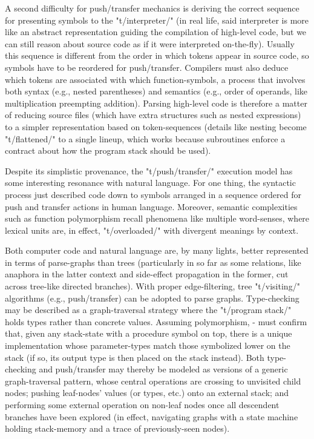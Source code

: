 A second difficulty for push/transfer mechanics is deriving the correct 
sequence for presenting symbols to the "t/interpreter/" (in real life, said 
interpreter is more like an abstract representation guiding the compilation 
of high-level code, but we can still reason about source 
code as if it were interpreted on-the-fly).  Usually this sequence is 
different from the order in which tokens appear in source code, so symbols 
have to be reordered for push/transfer.  Compilers must also deduce which tokens 
are associated with which function-symbols, a process that involves 
both syntax (e.g., nested parentheses) and semantics (e.g., order of operands, 
like multiplication preempting addition).  Parsing high-level code is therefore a 
matter of reducing source files (which have extra structures such as nested 
expressions) to a simpler representation based on token-sequences 
(details like nesting become "t/flattened/" to a single lineup, which works 
because subroutines enforce a contract about how the program stack should be used). 

Despite its simplistic provenance, the "t/push/transfer/" execution model 
has some interesting resonance with natural language.  For one 
thing, the syntactic process just described %
code down to symbols arranged in a sequence ordered for push and transfer 
actions %
in human language.  Moreover, semantic complexities such as 
function polymorphism recall phenomena like multiple word-senses, 
where lexical units are, in effect, "t/overloaded/" with divergent 
meanings by context.  

Both computer code and natural language are, by many lights, 
better represented in terms of parse-graphs than trees 
(particularly in so far as some relations, like anaphora in the latter context 
and side-effect propagation in the former, cut across tree-like 
directed branches).  With proper edge-filtering, tree "t/visiting/" 
algorithms (e.g., push/transfer) can be adopted to parse graphs.
Type-checking may be described as a graph-traversal 
strategy where the "t/program stack/" holds types rather 
than concrete values.  Assuming 
polymorphism, -%
must confirm that, given any stack-state with a 
procedure symbol on top, there is a unique implementation 
whose parameter-types match those symbolized lower on the stack 
(if so, its output type is then placed on the stack 
instead).  Both type-checking 
and push/transfer may thereby be modeled 
as versions of a generic graph-traversal pattern, whose 
central operations are crossing to unvisited child nodes; 
pushing leaf-nodes' values (or types, etc.) onto an 
external stack; and performing some external operation 
on non-leaf nodes once all descendent branches have been explored 
(in effect, navigating graphs with a state 
machine holding stack-memory and a trace of previously-seen nodes).

